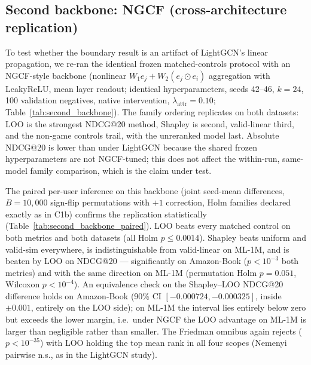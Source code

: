 \documentclass[pdflatex,sn-mathphys-num]{sn-jnl}
\begin{document}
\subsection{Second backbone: NGCF (cross-architecture replication)}\label{subsec:second_backbone}

To test whether the boundary result is an artifact of LightGCN's linear propagation, we re-ran the identical frozen matched-controls protocol with an NGCF-style backbone (nonlinear $W_1e_j+W_2(e_j\odot e_i)$ aggregation with LeakyReLU, mean layer readout; identical hyperparameters, seeds 42--46, $k=24$, 100 validation negatives, native intervention, $\lambda_{\text{attr}}=0.10$; Table~\ref{tab:second_backbone}). The family ordering replicates on both datasets: LOO is the strongest NDCG@20 method, Shapley is second, valid-linear third, and the non-game controls trail, with the unreranked model last. Absolute NDCG@20 is lower than under LightGCN because the shared frozen hyperparameters are not NGCF-tuned; this does not affect the within-run, same-model family comparison, which is the claim under test.

The paired per-user inference on this backbone (joint seed-mean differences, $B=10{,}000$ sign-flip permutations with $+1$ correction, Holm families declared exactly as in C1b) confirms the replication statistically (Table~\ref{tab:second_backbone_paired}). LOO beats every matched control on both metrics and both datasets (all Holm $p\le0.0014$). Shapley beats uniform and valid-sim everywhere, is indistinguishable from valid-linear on ML-1M, and is beaten by LOO on NDCG@20 --- significantly on Amazon-Book ($p<10^{-3}$ both metrics) and with the same direction on ML-1M (permutation Holm $p=0.051$, Wilcoxon $p<10^{-4}$). An equivalence check on the Shapley--LOO NDCG@20 difference holds on Amazon-Book (90\% CI $[-0.000724,-0.000325]$, inside $\pm0.001$, entirely on the LOO side); on ML-1M the interval lies entirely below zero but exceeds the lower margin, i.e.\ under NGCF the LOO advantage on ML-1M is larger than negligible rather than smaller. The Friedman omnibus again rejects ($p<10^{-35}$) with LOO holding the top mean rank in all four scopes (Nemenyi pairwise n.s., as in the LightGCN study).
\end{document}
